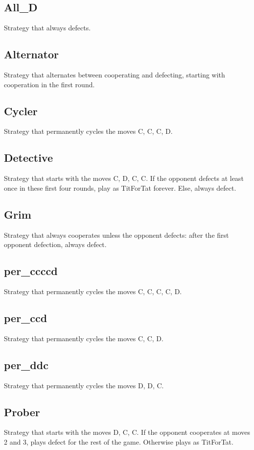 \subsection{All\_D}
Strategy that always defects.

\subsection{Alternator}
Strategy that alternates between cooperating and defecting, starting with cooperation in the first round.

\subsection{Cycler}
Strategy that permanently cycles the moves C, C, C, D.

\subsection{Detective}
Strategy that starts with the moves C, D, C, C. If the opponent defects at least once in these first four rounds, play as TitForTat forever. Else, always defect.

\subsection{Grim}
Strategy that always cooperates unless the opponent defects: after the first opponent defection, always defect.

\subsection{per\_ccccd}
Strategy that permanently cycles the moves C, C, C, C, D.

\subsection{per\_ccd}
Strategy that permanently cycles the moves C, C, D.

\subsection{per\_ddc}
Strategy that permanently cycles the moves D, D, C.

\subsection{Prober}
Strategy that starts with the moves D, C, C. If the opponent cooperates at moves 2 and 3, plays defect for the rest of the game. Otherwise plays as TitForTat.

